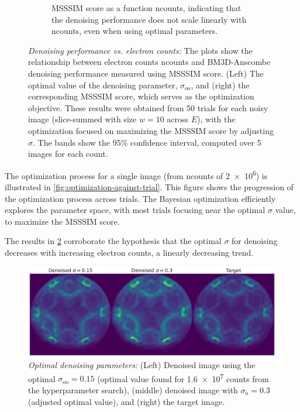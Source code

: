 \begin{figure}
\begin{subfigure}[t]{0.49\linewidth}
        \caption{\gls{MSSSIM} score as a function \gls{ncounts}, indicating that the denoising performance does not scale linearly with \gls{ncounts}, even when using optimal parameters.}
        \label{fig:hyperparameter-msssim-averaged-10-images}
    \end{subfigure}
    \caption{\textit{Denoising performance vs. electron counts:} The plots show the relationship between electron counts \gls{ncounts} and \gls{BM3D}-Anscombe denoising performance measured using \gls{MSSSIM} score. (Left) The optimal value of the denoising parameter, $\sigma_{\text{oo}}$, and (right) the corresponding \gls{MSSSIM} score, which serves as the optimization objective. These results were obtained from \num{50} trials for each noisy image (slice-summed with size $w=10$ across $E$), with the optimization focused on maximizing the \gls{MSSSIM} score by adjusting $\sigma$. The bands show the \num{95}\% confidence interval, computed over \num{5} images for each count.}
    \label{fig:hyperparameter-averaged-10-images}
\end{figure}
The optimization process for a single image (from \gls{ncounts} of \num{2e6}) is illustrated in \cref{fig:optimization-against-trial}. This figure shows the progression of the optimization process across trials. The Bayesian optimization efficiently explores the parameter space, with most trials focusing near the optimal $\sigma$ value, to maximize the \gls{MSSSIM} score.

The results in \cref{fig:hyperparameter-averaged-10-images} corroborate the hypothesis that the optimal $\sigma$ for denoising decreases with increasing electron counts, a linearly decreasing trend.


\begin{figure}
    \centering
    \includegraphics[width=1\linewidth]{images/denoised_optimal_sigma.pdf}
    \caption{\textit{Optimal denoising parameters:} (Left) Denoised image using the optimal $\sigma_{\text{oo}}=0.15$ (optimal value found for \num{1.6e7} counts from the hyperparameter search), (middle) denoised image with $\sigma_{\text{o}}=0.3$ (adjusted optimal value), and (right) the target image.}
    \label{fig:denoised-optimal-sigma}
\end{figure}

